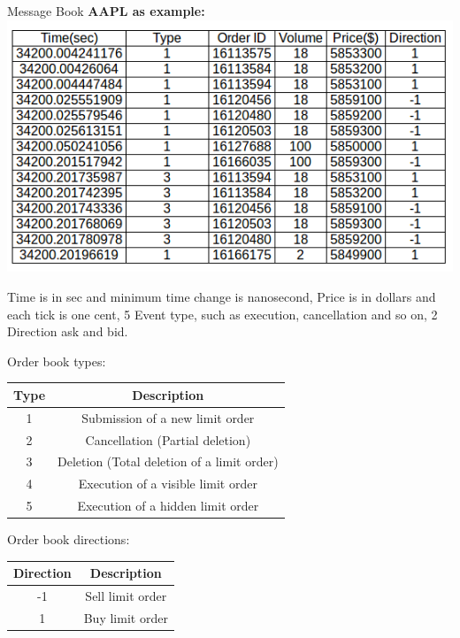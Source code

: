 \documentclass[xcolor={x11names,svgnames,dvipsnames}]{beamer}
\begin{document}
\begin{frame}
\begin{block}{Message Book}
\textbf{AAPL as example:}
\includegraphics[width=1\textwidth, height=0.6\textheight]{message_book_new.png}
\end{block}

Time is in sec and minimum time change is \alert{nanosecond}, Price is in dollars and each tick is one cent, 5 Event type, such as execution, cancellation and so on, 2 Direction ask and bid. 

\end{frame}

\begin{frame}


\begin{block}{Order book types:}
\begin{table}
\centering
     \begin{tabular}{|c|c|}
     \hline  Type& Description \\ 
     \hline 1& Submission of a new limit order  \\ 
     \hline 2& Cancellation (Partial deletion) \\ 
     \hline 3 & Deletion (Total deletion of a limit order)  \\ 
     \hline 4&   Execution of a visible limit order    \\ 
     \hline 5&   Execution of a hidden limit order\\ 
     \hline 
     \end{tabular} 
\end{table}
\end{block}

\begin{block}{Order book directions:}

\begin{table}
\centering
     \begin{tabular}{|c|c|}
     \hline  Direction& Description \\ 
     \hline -1 &  Sell limit order \\ 
     \hline 1&  Buy limit order\\ 
     \hline
     \end{tabular} 
\end{table}
\end{block}



\end{frame}
\end{document}

